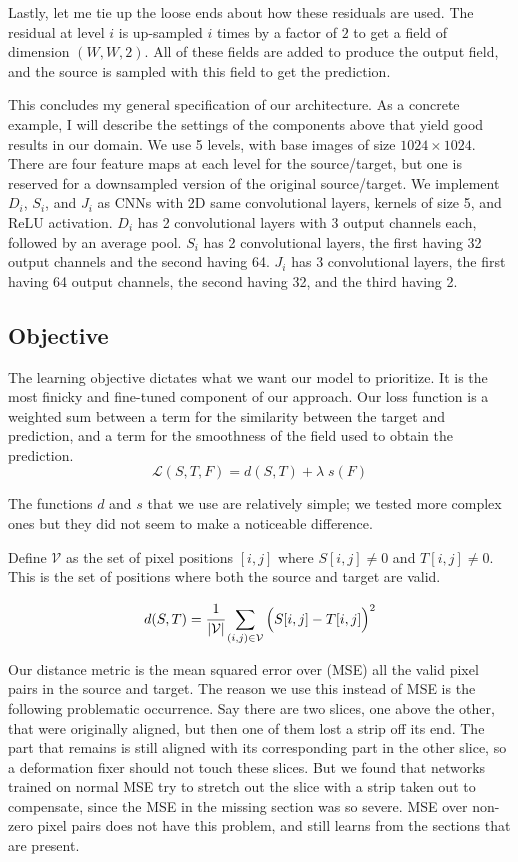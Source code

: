 \documentclass[12pt,a4paper]{article}
\begin{document}
Lastly, let me tie up the loose ends about how these residuals are used. The residual at level $i$ is up-sampled $i$ times by a factor of $2$ to get a field of dimension $(W, W, 2)$. All of these fields are added to produce the output field, and the source is sampled with this field to get the prediction.

This concludes my general specification of our architecture. As a concrete example, I will describe the settings of the components above that yield good results in our domain. We use 5 levels, with base images of size $1024 \times 1024$. There are four feature maps at each level for the source/target, but one is reserved for a downsampled version of the original source/target. We implement $D_i$, $S_i$, and $J_i$ as CNNs with 2D same convolutional layers, kernels of size 5, and ReLU activation. $D_i$ has 2 convolutional layers with 3 output channels each, followed by an average pool. $S_i$ has 2 convolutional layers, the first having 32 output channels and the second having 64. $J_i$ has 3 convolutional layers, the first having 64 output channels, the second having 32, and the third having 2.

\subsection{Objective}

The learning objective dictates what we want our model to prioritize. It is the most finicky and fine-tuned component of our approach. Our loss function is a weighted sum between a term for the similarity between the target and prediction, and a term for the smoothness of the field used to obtain the prediction.
$$ \mathcal{L}(S, T, F) = d(S, T) + \lambda \; s(F)$$

The functions $d$ and $s$ that we use are relatively simple; we tested more complex ones but they did not seem to make a noticeable difference.

Define $\mathcal{V}$ as the set of pixel positions $[i,j]$ where $S[i,j] \neq 0$ and $T[i,j] \neq 0$. This is the set of positions where both the source and target are valid.

$$ d(S,T) = \cfrac{1}{|\mathcal{V}|} \sum\limits_{(i, j) \in \mathcal{V}} \Big( S[i,j] - T[i,j] \Big)^2 $$

Our distance metric is the mean squared error over (MSE) all the valid pixel pairs in the source and target. The reason we use this instead of MSE is the following problematic occurrence. Say there are two slices, one above the other, that were originally aligned, but then one of them lost a strip off its end. The part that remains is still aligned with its corresponding part in the other slice, so a deformation fixer should not touch these slices. But we found that networks trained on normal MSE try to stretch out the slice with a strip taken out to compensate, since the MSE in the missing section was so severe. MSE over non-zero pixel pairs does not have this problem, and still learns from the sections that are present.
\end{document}
